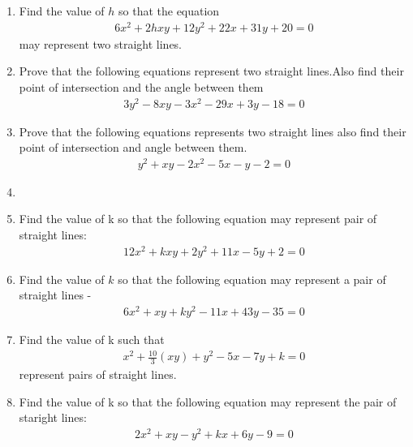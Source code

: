 \renewcommand{\theequation}{\theenumi}
\renewcommand{\thefigure}{\theenumi}
\begin{enumerate}[label=\thesection.\arabic*.,ref=\thesection.\theenumi]
%
\item 
Find the value of $h$ so that the equation 
\begin{align}
6x^2+2hxy+12y^2+22x+31y+20=0
\label{eq:solutions/13/ex2/question}
\end{align}
 may represent two straight lines.
\\
\solution

\item Prove that the following equations represent two straight lines.Also find their point of intersection and the angle between them
\begin{align}
 3y^2-8xy-3x^2-29x+3y-18=0   
\label{eq:solutions/13/3/1}
\end{align}
\solution

\item Prove that the following equations represents two straight lines also find their point of intersection and angle between them.
\begin{align}
y^2+xy-2x^2-5x-y-2=0
\end{align}
%
\solution

\item 
%
\solution

\item Find the value of k so that the following equation may represent pair of straight lines: 
\begin{align}
    12x^2+kxy+2y^2+11x-5y+2=0\label{eq:solutions/13/8/1.1}
\end{align}
\solution

%
\item Find the value of $k$ so that the following equation may represent a pair of straight lines - 
\begin{align}
6x^2 +xy+ky^2-11x+43y-35 = 0 \label{eq:solutions/13/94}
\end{align}
\solution



\item Find the value of k such that 
\begin{align}
x^{2}+ \frac{10}{3}(xy)+y^2 -5x -7y + k =0 \label{eq:solutions/13/11eq5}
\end{align}
 represent pairs of straight lines.
\solution


\item Find the value of k so that the following equation may represent the pair of staright lines:
\begin{align}
	2x^2+ xy -y^2 + kx + 6y - 9 = 0 \label{eq:solutions/13/13/1} 
\end{align}

\solution


\end{enumerate}


